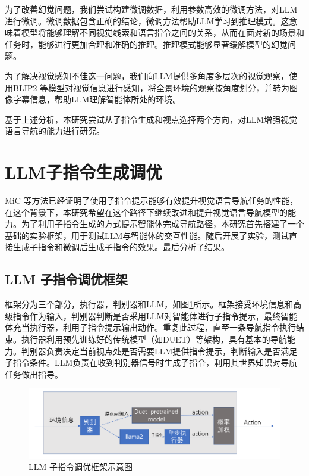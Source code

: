 \documentclass[bachelor]{thesis-uestc}
\begin{document}
为了改善幻觉问题，我们尝试构建微调数据，利用参数高效的微调方法，对LLM进行微调。微调数据包含正确的结论，微调方法帮助LLM学习到推理模式。这意味着模型将能够理解不同视觉线索和语言指令之间的关系，从而在面对新的场景和任务时，能够进行更加合理和准确的推理。推理模式能够显著缓解模型的幻觉问题。

为了解决视觉感知不佳这一问题，我们向LLM提供多角度多层次的视觉观察，使用BLIP2 等模型对视觉信息进行感知，将全景环境的观察按角度划分，并转为图像字幕信息，帮助LLM理解智能体所处的环境。

基于上述分析，本研究尝试从子指令生成和视点选择两个方向，对LLM增强视觉语言导航的能力进行研究。
  
\section{LLM子指令生成调优}

MiC 等方法已经证明了使用子指令提示能够有效提升视觉语言导航任务的性能，在这个背景下，本研究希望在这个路径下继续改进和提升视觉语言导航模型的能力。为了利用子指令生成的方式提示智能体完成导航路径，本研究首先搭建了一个基础的实验框架，用于测试LLM与智能体的交互性能。随后开展了实验，测试直接生成子指令和微调后生成子指令的效果。最后分析了结果。

\subsection{LLM 子指令调优框架}

框架分为三个部分，执行器，判别器和LLM，如图\ref{ft}所示。框架接受环境信息和高级指令作为输入，判别器判断是否采用LLM对智能体进行子指令提示，最终智能体充当执行器，利用子指令提示输出动作。重复此过程，直至一条导航指令执行结束。执行器利用预先训练好的传统模型（如DUET）等架构，具有基本的导航能力。判别器负责决定当前视点处是否需要LLM提供指令提示，判断输入是否满足子指令条件。LLM负责在收到判别器信号时生成子指令，利用其世界知识对导航任务做出指导。

\begin {figure}[h]
\centering %
\includegraphics[width=\textwidth]{1932-042816.png}
\caption{LLM 子指令调优框架示意图} %
\label{ft}
\end {figure}
\end{document}
